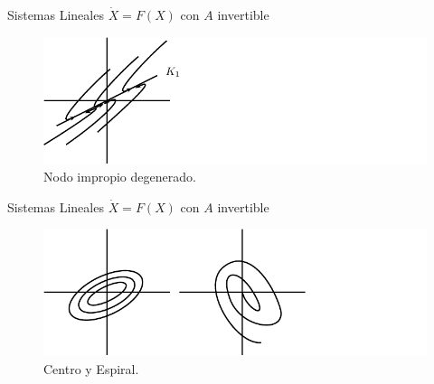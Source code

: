 \documentclass{beamer}
\begin{document}
\begin{frame}{Sistemas Lineales $\dot{X} = F(X)$ con $A$ invertible}
\begin{figure}[!ht] \centering
    \includegraphics[scale=1.0]{../figures/nodoimpropio.pdf}
\caption{Nodo impropio degenerado.}
\end{figure}
\end{frame}

\begin{frame}{Sistemas Lineales $\dot{X} = F(X)$ con $A$ invertible}
\begin{figure}[!ht] \centering
    \includegraphics[scale=1.0]{../figures/centroyespiral.pdf}
\caption{Centro y Espiral.}
\end{figure}
\end{frame}
\end{document}
